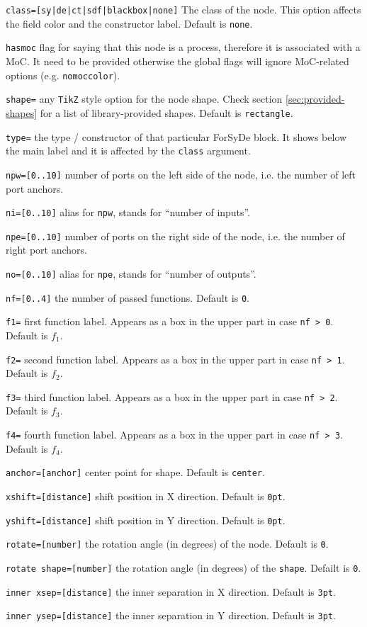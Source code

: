\documentclass[10pt]{article}
\newenvironment{optionslist}[0]{ 
\begin{list}{}{
	\setlength{\itemindent}{-10pt}
	\setlength{\itemsep}{0pt}
	\setlength{\parsep}{0pt}
}}{\end{list}}
\begin{document}
\begin{optionslist}
\item \texttt{class=[sy|de|ct|sdf|blackbox|none]} The class of the node. This option affects the field color and the constructor label. Default is \texttt{none}.
\item \texttt{hasmoc} flag for saying that this node is a process, therefore it is associated with a MoC. It need to be provided otherwise the global flags will ignore MoC-related options (e.g. \texttt{nomoccolor}).
\item \texttt{shape=} any \texttt{TikZ} style option for the node shape. Check section \ref{sec:provided-shapes} for a list of library-provided shapes. Default is \texttt{rectangle}.
\item \texttt{type=} the type / constructor of that particular ForSyDe block. It shows below the main label and it is affected by the \texttt{class} argument.
\item \texttt{npw=[0..10]} number of ports on the left side of the node, i.e. the number of left port anchors.
\item \texttt{ni=[0..10]} alias for \texttt{npw}, stands for ``number of inputs''.
\item \texttt{npe=[0..10]} number of ports on the right side of the node, i.e. the number of right port anchors.
\item \texttt{no=[0..10]} alias for \texttt{npe}, stands for ``number of outputs''.
\item \texttt{nf=[0..4]} the number of passed functions. Default is \texttt{0}.
\item \texttt{f1=} first function label. Appears as a box in the upper part in case \texttt{nf > 0}. Default is $f_1$.
\item \texttt{f2=} second function label. Appears as a box in the upper part in case \texttt{nf > 1}. Default is $f_2$.
\item \texttt{f3=} third function label. Appears as a box in the upper part in case \texttt{nf > 2}. Default is $f_3$.
\item \texttt{f4=} fourth function label. Appears as a box in the upper part in case \texttt{nf > 3}. Default is $f_4$.
\item \texttt{anchor=[anchor]} center point for shape. Default is \texttt{center}.
\item \texttt{xshift=[distance]} shift position in X direction. Default is \texttt{0pt}.
\item \texttt{yshift=[distance]} shift position in Y direction. Default is \texttt{0pt}.
\item \texttt{rotate=[number]} the rotation angle (in degrees) of the node. Default is \texttt{0}.
\item \texttt{rotate shape=[number]} the rotation angle (in degrees) of the \texttt{shape}. Defailt is \texttt{0}.
\item \texttt{inner xsep=[distance]} the inner separation in X direction. Default is \texttt{3pt}.
\item \texttt{inner ysep=[distance]} the inner separation in Y direction. Default is \texttt{3pt}.
\end{optionslist}
\end{document}
